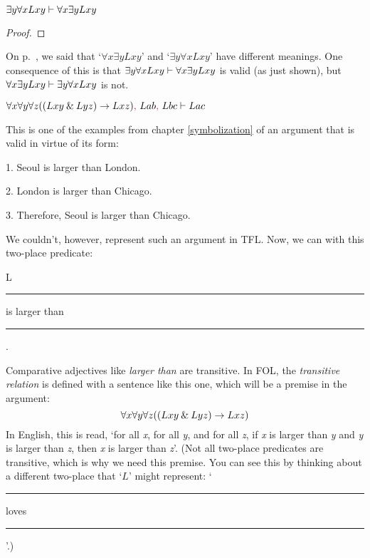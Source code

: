 \begin{earg}
\item $\exists y \forall xLxy \vdash \forall x \exists yLxy$

\begin{proof}
	 \pr{}
	\open
		 \as{}
		 
		 
		 
	\close
	 
\end{proof}
\smallskip
On p.~\pageref{quantifier-order}, we said that `$\forall x \exists yLxy$' and `$\exists y \forall xLxy$' have different meanings. One consequence of this is that $\exists y \forall xLxy \vdash \forall x \exists yLxy$ is valid (as just shown), but $\forall x \exists yLxy \vdash \exists y \forall xLxy$ is not. 
\bigskip

\item $\forall x \forall y \forall z((Lxy \mathbin{\&} Lyz) \rightarrow Lxz)\textcolor{magenta}{,}~ Lab\textcolor{magenta}{,}~ Lbc \vdash Lac$
\end{earg}  %

\noindent\begin{minipage}{0.99\textwidth}
This is one of the examples from chapter \ref{symbolization} of an argument that is valid in virtue of its form:
	\begin{earg}
		\item[1.] Seoul is larger than London.
		\item[2.] London is larger than Chicago.
		\item[3.] Therefore, Seoul is larger than Chicago. 
	\end{earg}
\end{minipage}\bigskip

\noindent We couldn't, however, represent such an argument in TFL. Now, we can with this two-place predicate: 
\begin{ekey}
	\item[L] \rule{1cm}{0.15mm} is larger than \rule{1cm}{0.15mm} .
\end{ekey}
Comparative adjectives like \textit{larger than} are transitive. In FOL, the \textit{transitive relation} is defined with a sentence like this one, which will be a premise in the argument:
$$\forall x \forall y \forall z((Lxy \mathbin{\&} Lyz) \rightarrow Lxz)$$
In English, this is read, `for all \textit{x}, for all \textit{y}, and for all \textit{z}, if \textit{x} is larger than \textit{y} and \textit{y} is larger than \textit{z}, then \textit{x} is larger than \textit{z}'. 
(Not all two-place predicates are transitive, which is why we need this premise. You can see this by thinking about a different two-place that `$L$' might represent: `\rule{1cm}{0.15mm} loves \rule{1cm}{0.15mm}'.)


